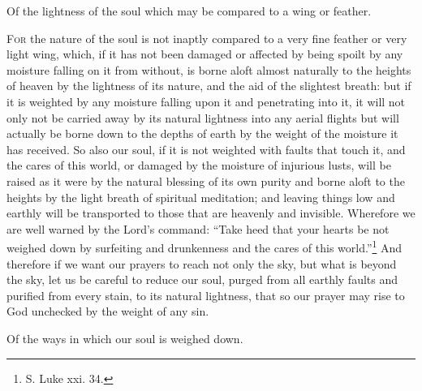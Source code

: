 Of the lightness of the soul which may be compared to a wing or feather.

\textsc{For} the nature of the soul is not inaptly compared to a very fine feather or very light wing, which, if it has not been damaged or affected by being spoilt by any moisture falling on it from without, is borne aloft almost naturally to the heights of heaven by the lightness of its nature, and the aid of the slightest breath: but if it is weighted by any moisture falling upon it and penetrating into it, it will not only not be carried away by its natural lightness into any aerial flights but will actually be borne down to the depths of earth by the weight of the moisture it has received. So also our soul, if it is not weighted with faults that touch it, and the cares of this world, or damaged by the moisture of injurious lusts, will be raised as it were by the natural blessing of its own purity and borne aloft to the heights by the light breath of spiritual meditation; and leaving things low and earthly will be transported to those that are heavenly and invisible. Wherefore we are well warned by the Lord’s command: “Take heed that your hearts be not weighed down by surfeiting and drunkenness and the cares of this world.”\footnote{S. Luke xxi. 34.} And therefore if we want our prayers to reach not only the sky, but what is beyond the sky, let us be careful to reduce our soul, purged from all earthly faults and purified from every stain, to its natural lightness, that so our prayer may rise to God unchecked by the weight of any sin.


Of the ways in which our soul is weighed down.

